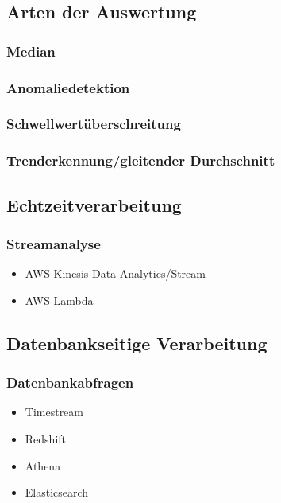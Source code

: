 


\subsection{Arten der Auswertung}
\subsubsection{Median}
\subsubsection{Anomaliedetektion}
\subsubsection{Schwellwertüberschreitung}
\subsubsection{Trenderkennung/gleitender Durchschnitt}

\subsection{Echtzeitverarbeitung}
\subsubsection{Streamanalyse}
\begin{itemize}
\item AWS Kinesis Data Analytics/Stream
\item AWS Lambda
\end{itemize}

\subsection{Datenbankseitige Verarbeitung}
\subsubsection{Datenbankabfragen}
\begin{itemize}
\item Timestream
\item Redshift
\item Athena
\item Elasticsearch
\end{itemize}

